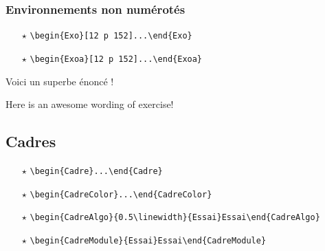 \documentclass[12pt,french,oneside]{book}
\begin{document}
\begin{spacing}{1.2}
\subsubsection{Environnements non numérotés}

\begin{itemize}

\item[$\star$] \verb=\begin{Exo}[12 p 152]...\end{Exo}=\,

\item[$\star$] \verb=\begin{Exoa}[12 p 152]...\end{Exoa}=\,

\end{itemize}

\begin{Exo}[12 p 152]
Voici un superbe énoncé !
\end{Exo}

\begin{Exoa}[12 p 152]
Here is an awesome wording of exercise!
\end{Exoa}

\subsection{Cadres}

\begin{itemize}
\item[$\star$] \verb=\begin{Cadre}...\end{Cadre}=\,

\item[$\star$] \verb!\begin{CadreColor}...\end{CadreColor}!

\item[$\star$] \verb!\begin{CadreAlgo}{0.5\linewidth}{Essai}Essai\end{CadreAlgo}!

\item[$\star$] \verb!\begin{CadreModule}{Essai}Essai\end{CadreModule}!

\end{itemize}

\begin{Cadre}
\dotfill
\end{Cadre}


\end{spacing}
\end{document}
